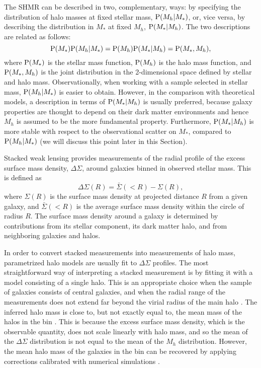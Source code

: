 \documentclass[usenatbib]{mnras}
\def\mstar{M_*}
\def\mhalo{M_{h}}
\def\pr{{\rm P}}
\begin{document}
The SHMR can be described in two, complementary, ways: by specifying the distribution of halo masses at fixed stellar mass, $\pr(\mhalo|\mstar)$, or, vice versa, by describing the distribution in $\mstar$ at fixed $\mhalo$, $\pr(\mstar|\mhalo)$.
The two descriptions are related as follows:
\begin{equation}
\pr(\mstar)\pr(\mhalo|\mstar) = \pr(\mhalo)\pr(\mstar|\mhalo) = \pr(\mstar,\mhalo),
\end{equation}
where $\pr(\mstar)$ is the stellar mass function, $\pr(\mhalo)$ is the halo mass function, and $\pr(\mstar,\mhalo)$ is the joint distribution in the 2-dimensional space defined by stellar and halo mass.
Observationally, when working with a sample selected in stellar mass, $\pr(\mhalo|\mstar)$ is easier to obtain.
However, in the comparison with theoretical models, a description in terms of $\pr(\mstar|\mhalo)$ is usually preferred, because galaxy properties are thought to depend on their dark matter environments and hence $M_h$ is assumed to be the more fundamental property. 
Furthermore, $\pr(\mstar|\mhalo)$ is more stable with respect to the observational scatter on $\mstar$, compared to $\pr(\mhalo|\mstar)$ (we will discuss this point later in this Section).

Stacked weak lensing provides measurements of the radial profile of the excess surface mass density, $\Delta\Sigma$, around galaxies binned in observed stellar mass. 
This is defined as
\begin{equation}
\Delta\Sigma(R) = \bar{\Sigma}(<R) - \Sigma(R), 
\end{equation}
where $\Sigma(R)$ is the surface mass density at projected distance $R$ from a given galaxy, and $\bar{\Sigma}(<R)$ is the average surface mass density within the circle of radius $R$.
The surface mass density around a galaxy is determined by contributions from its stellar component, its dark matter halo, and from neighboring galaxies and halos.

In order to convert stacked measurements into measurements of halo mass, parametrized halo models are usually fit to $\Delta\Sigma$ profiles.
The most straightforward way of interpreting a stacked measurement is by fitting it with a model consisting of a single halo.
This is an appropriate choice when the sample of galaxies consists of central galaxies, and when the radial range of the measurements does not extend far beyond the virial radius of the main halo \citep[see e.g.][]{Man++16}.
The inferred halo mass is close to, but not exactly equal to, the mean mass of the halos in the bin \citep{Man++05}. This is because the excess surface mass density, which is the observable quantity, does not scale linearly with halo mass, and so the mean of the $\Delta\Sigma$ distribution is not equal to the mean of the $\mhalo$ distribution. However, the mean halo mass of the galaxies in the bin can be recovered by applying corrections calibrated with numerical simulations \citep{Man++16}.
\end{document}
